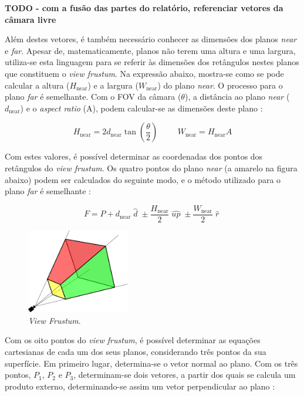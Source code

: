 \documentclass[12pt, a4paper]{article}
\begin{document}
\textbf{\color{red} TODO - com a fusão das partes do relatório, referenciar vetores da câmara livre}

Além destes vetores, é também necessário conhecer as dimensões dos planos \emph{near} e \emph{far}.
Apesar de, matematicamente, planos não terem uma altura e uma largura, utiliza-se esta linguagem
para se referir às dimensões dos retângulos nestes planos que constituem o \emph{view frustum}. Na
expressão abaixo, mostra-se como se pode calcular a altura ($H_\text{near}$) e a largura
($W_\text{near}$) do plano \emph{near}. O processo para o plano \emph{far} é semelhante. Com o FOV
da câmara ($\theta$), a distância ao plano \emph{near} ($d_\text{near}$) e o \emph{aspect ratio}
(A), podem calcular-se as dimensões deste plano \cite{lighthouse3d-frustum-distances}:

$$
H_\text{near} = 2 d_\text{near} \tan \left ( \frac{\theta}{2} \right )
\hspace{1cm}
W_\text{near} = H_\text{near} A
$$

Com estes valores, é possível determinar as coordenadas dos pontos dos retângulos do
\emph{view frustum}. Os quatro pontos do plano \emph{near} (a amarelo na figura abaixo) podem ser
calculados do seguinte modo, e o método utilizado para o plano \emph{far} é semelhante
\cite{lighthouse3d-frustum-planes}:

$$
F = P +
    d_\text{near} \; \widehat{d} \; \pm
    \frac{H_\text{near}}{2} \; \widehat{up} \; \pm
    \frac{W_\text{near}}{2} \; \widehat{r} \;
$$

\begin{figure}[H]
    \centering
    \includegraphics[width=0.4\textwidth]{res/phase2/ViewFrustum.pdf}
    \caption{\emph{View Frustum}.}
\end{figure}

Com os oito pontos do \emph{view frustum}, é possível determinar as equações cartesianas de cada
um dos seus planos, considerando três pontos da sua superfície. Em primeiro lugar, determina-se o
vetor normal ao plano. Com os três pontos, $P_1$, $P_2$ e $P_3$, determinam-se dois vetores, a
partir dos quais se calcula um produto externo, determinando-se assim um vetor perpendicular ao
plano \cite{lighthouse3d-plane}:
\end{document}
